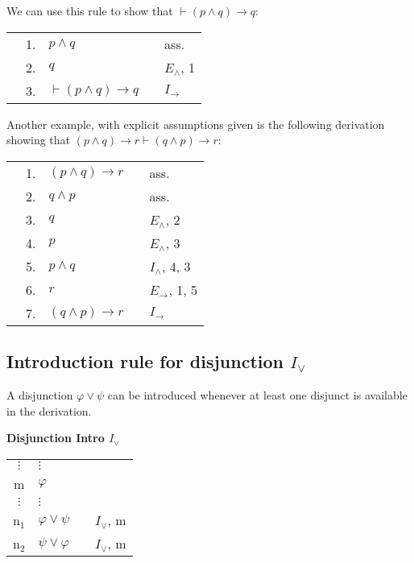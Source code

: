 \documentclass[nobib,nofonts]{tufte-handout}
\begin{document}
We can use this rule to show that $\vdash (p \wedge q) \rightarrow q$:

\begin{tabular}{cclcl}
   \cline{1-2} \vline & 1. & $p \wedge q$                        & & ass.  \\
   \vline             & 2. & $q$                                 & & $E_{\wedge}$, 1 \\ \hline
                      & 3. & $\vdash (p \wedge q) \rightarrow q$ & & $I_{\rightarrow}$ \\
\end{tabular}

Another example, with explicit assumptions given is the following derivation showing that  $(p \wedge q) \rightarrow r \vdash (q \wedge p) \rightarrow r$:

\begin{tabular}{cclcl}
                     & 1. & $(p \wedge q) \rightarrow r$ & & ass. \\
  \cline{1-2} \vline & 2. & $q \wedge p$                 & & ass. \\
  \vline             & 3. & $q$                          & & $E_{\wedge}$, 2  \\
  \vline             & 4. & $p$                          & & $E_{\wedge}$, 3  \\
  \vline             & 5. & $p \wedge q$                 & & $I_{\wedge}$, 4, 3  \\
  \vline             & 6. & $r$                          & & $E_{\rightarrow}$, 1, 5  \\ \hline
                     & 7. & $(q \wedge p) \rightarrow r$ & & $I_{\rightarrow}$
\end{tabular}

\subsection{Introduction rule for disjunction $I_{\vee}$}

A disjunction $\varphi \vee \psi$ can be introduced whenever at least one disjunct is available in the derivation.

\bigskip
\noindent \colorbox{mygray!60}{\centering
  \begin{minipage}[t]{0.35\linewidth}
    \textbf{Disjunction Intro $I_{\vee}$}
  \end{minipage}
  \begin{minipage}[t]{0.55\linewidth}
    \begin{tabular}{clcl}
      $\vdots$ & $\vdots$                   & \\
      m & $\varphi$  &  \\
      $\vdots$ & $\vdots$                   & \\
      n$_{1}$ & $\varphi \vee \psi$ & & $I_{\vee}$, m \\
      n$_{2}$ & $\psi \vee \varphi$ & & $I_{\vee}$, m
    \end{tabular}
  \end{minipage}
}
\bigskip
\end{document}
